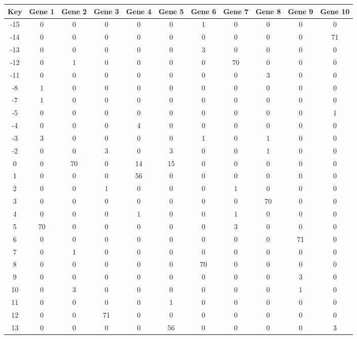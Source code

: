 \begin{tabular}{|c|c|c|c|c|c|c|c|c|c|c|}
\hline
Key & Gene 1 & Gene 2 & Gene 3 & Gene 4 & Gene 5 & Gene 6 & Gene 7 & Gene 8 & Gene 9 & Gene 10 \\
\hline
-15 & 0 & 0 & 0 & 0 & 0 & 1 & 0 & 0 & 0 & 0 \\
-14 & 0 & 0 & 0 & 0 & 0 & 0 & 0 & 0 & 0 & 71 \\
-13 & 0 & 0 & 0 & 0 & 0 & 3 & 0 & 0 & 0 & 0 \\
-12 & 0 & 1 & 0 & 0 & 0 & 0 & 70 & 0 & 0 & 0 \\
-11 & 0 & 0 & 0 & 0 & 0 & 0 & 0 & 3 & 0 & 0 \\
-8 & 1 & 0 & 0 & 0 & 0 & 0 & 0 & 0 & 0 & 0 \\
-7 & 1 & 0 & 0 & 0 & 0 & 0 & 0 & 0 & 0 & 0 \\
-5 & 0 & 0 & 0 & 0 & 0 & 0 & 0 & 0 & 0 & 1 \\
-4 & 0 & 0 & 0 & 4 & 0 & 0 & 0 & 0 & 0 & 0 \\
-3 & 3 & 0 & 0 & 0 & 0 & 1 & 0 & 1 & 0 & 0 \\
-2 & 0 & 0 & 3 & 0 & 3 & 0 & 0 & 1 & 0 & 0 \\
0 & 0 & 70 & 0 & 14 & 15 & 0 & 0 & 0 & 0 & 0 \\
1 & 0 & 0 & 0 & 56 & 0 & 0 & 0 & 0 & 0 & 0 \\
2 & 0 & 0 & 1 & 0 & 0 & 0 & 1 & 0 & 0 & 0 \\
3 & 0 & 0 & 0 & 0 & 0 & 0 & 0 & 70 & 0 & 0 \\
4 & 0 & 0 & 0 & 1 & 0 & 0 & 1 & 0 & 0 & 0 \\
5 & 70 & 0 & 0 & 0 & 0 & 0 & 3 & 0 & 0 & 0 \\
6 & 0 & 0 & 0 & 0 & 0 & 0 & 0 & 0 & 71 & 0 \\
7 & 0 & 1 & 0 & 0 & 0 & 0 & 0 & 0 & 0 & 0 \\
8 & 0 & 0 & 0 & 0 & 0 & 70 & 0 & 0 & 0 & 0 \\
9 & 0 & 0 & 0 & 0 & 0 & 0 & 0 & 0 & 3 & 0 \\
10 & 0 & 3 & 0 & 0 & 0 & 0 & 0 & 0 & 1 & 0 \\
11 & 0 & 0 & 0 & 0 & 1 & 0 & 0 & 0 & 0 & 0 \\
12 & 0 & 0 & 71 & 0 & 0 & 0 & 0 & 0 & 0 & 0 \\
13 & 0 & 0 & 0 & 0 & 56 & 0 & 0 & 0 & 0 & 3 \\
\hline
\end{tabular}